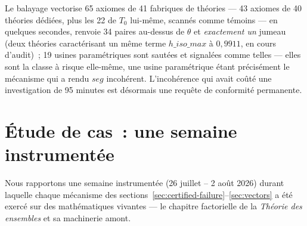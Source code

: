 \documentclass[11pt]{article}
\theoremstyle{remark}\newtheorem{example}{Exemple}
\begin{document}
Le balayage vectorise 65 axiomes de 41 fabriques de théories --- 43 axiomes de
40 théories dédiées, plus les 22 de $T_0$ lui-même, scannés comme témoins --- en
quelques secondes, renvoie 34 paires au-dessus de $\theta$ et \emph{exactement un}
jumeau (deux théories caractérisant un même terme $h\_iso\_max$ à $0{,}9911$, en cours
d'audit)~; 19 usines paramétriques sont sautées et signalées comme telles --- elles sont la classe
à risque elle-même, une usine paramétrique étant précisément le mécanisme qui a rendu
$\mathit{seg}$ incohérent. L'incohérence qui avait coûté une investigation de 95 minutes est
désormais une requête de conformité permanente.

\section{Étude de cas~: une semaine instrumentée}
\label{sec:case-study}
\label{sec:casestudy}

Nous rapportons une semaine instrumentée (26 juillet -- 2 août 2026) durant laquelle
chaque mécanisme des sections~\ref{sec:certified-failure}--\ref{sec:vectors} a été
exercé sur des mathématiques vivantes --- le chapitre factorielle de la
\emph{Th\'eorie des ensembles} et sa machinerie amont.
\end{document}
